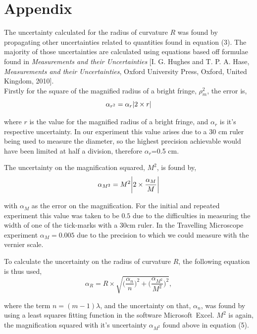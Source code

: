 \documentclass[twocolumn]{revtex4}
\begin{document}
\section*{Appendix}
\vspace{-2ex}

The uncertainty calculated for the radius of curvature $R$ was found by propagating other uncertainties related to quantities found in equation (3). The majority of those uncertainties are calculated using equations based off formulae found in \textit{Measurements and their Uncertainties} [I. G. Hughes and T. P. A. Hase, \textit{Measurements and their Uncertainties}, Oxford University Press, Oxford, United Kingdom, 2010]. 
\\

Firstly for the square of the magnified radius of a bright fringe, $\rho_m^2$, the error is, 
\begin{equation} 
\alpha_{r^2}=\alpha_r\abs{2\times r}
\end{equation}

where $r$ is the value for the magnified radius of a bright fringe, and $\alpha_r$ is it's respective uncertainty. In our experiment this value arises due to a 30 cm ruler being used to measure the diameter, so the highest precision achievable would have been limited at half a division, therefore $\alpha_r$=0.5 cm. 

The uncertainty on the magnification squared, $M^2$, is found by,
\begin{equation} 
\alpha_{M^2}=M^2\abs{2\times\frac{\alpha_M}{M}}
\end{equation}

with $\alpha_{M}$ as the error on the magnification. For the initial and repeated experiment this value was taken to be $0.5$ due to the difficulties in measuring the width of one of the tick-marks with a $30$cm ruler. In the Travelling Microscope experiment $\alpha_{M}=0.005$ due to the precision to which we could measure with the vernier scale.    

To calculate the uncertainty on the radius of curvature $R$, the following equation is thus used,
\begin{equation} 
\alpha_R=R\times\sqrt{\Big(\frac{\alpha_n}{n}\Big)^2 + \Big(\frac{\alpha_{M^2}}{M^2}\Big)^2 },
\end{equation}

where the term $n=(m-1)\lambda$, and the uncertainty on that, $\alpha_n$, was found by using a least squares fitting function in the software Microsoft\textregistered \ Excel. $M^2$ is again, the magnification squared with it's uncertainty $\alpha_{M^2}$ found above in equation (5).  
\end{document}
